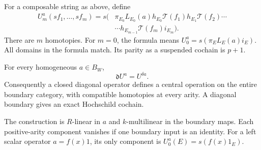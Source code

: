 For a composable string as above, define
\begin{equation}
 \begin{split}
 U^a_m(sf_1,\ldots,sf_m)
  =s\bigl(&\pi_{E_0}L_{E_0}(a)h_{E_0}\mathcal T(f_1)
       h_{E_1}\mathcal T(f_2)\cdots\\
       &{}\cdots h_{E_{m-1}}\mathcal T(f_m)i_{E_m}\bigr).
 \end{split}
 \label{eq:cc-components}
\end{equation}
There are \(m\) homotopies. For \(m=0\), the formula means
\(U^a_0=s(\pi_EL_E(a)i_E)\).
All domains in the formula match. Its parity as a suspended
cochain is \(p+1\).

\begin{theorem}
\label{thm:cc-coherent}
For every homogeneous \(a\in B_W\),
\begin{equation}
 \mathfrak d U^a=U^{\delta a}.
 \label{eq:cc-chain-map}
\end{equation}
Consequently a closed diagonal operator defines a central
operation on the entire boundary category, with compatible
homotopies at every arity. A diagonal boundary gives an exact
Hochschild cochain.

The construction is \(R\)-linear in \(a\) and \(k\)-multilinear
in the boundary maps. Each positive-arity component vanishes
if one boundary input is an identity. For a left scalar
operator \(a=f(x)1\), its only component is
\(U^a_0(E)=s(f(x)1_E)\).
\end{theorem}
